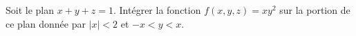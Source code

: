 
\begin{exercice}\label{exoOutilsMath-0139}

    Soit le plan \( x+y+z=1\). Intégrer la fonction \( f(x,y,z)=xy^2\) sur la portion de ce plan donnée par \( | x |<2\) et \( -x<y<x\).

\end{exercice}
